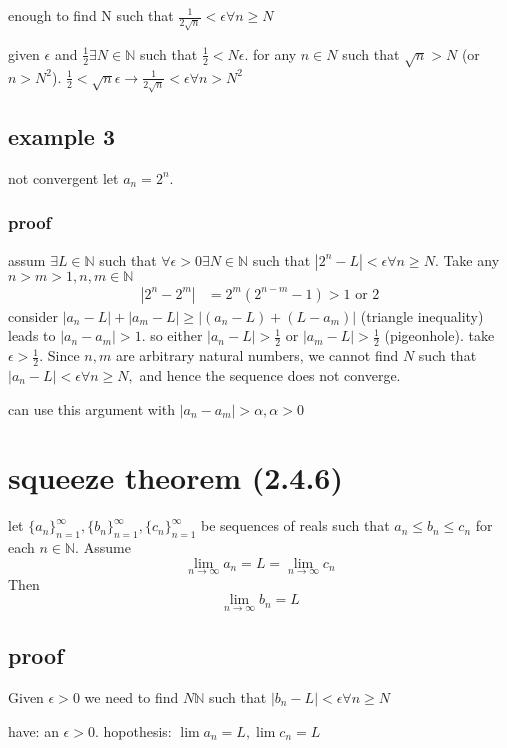 \documentclass[letterpaper]{article}
\begin{document}
enough to find N such that $\frac{1}{2\sqrt{n}}<\epsilon\forall n\ge N$

given $\epsilon$ and $\frac{1}{2}$$\exists N\in\mathbb{N}$ such that $\frac{1}{2}<N\epsilon$. for any $n\in N$ such that $\sqrt{n}>N$ (or $n>N^2$). $\frac{1}{2}<\sqrt{n}\epsilon\rightarrow\frac{1}{2\sqrt{n}}<\epsilon\forall n>N^2$

\subsection*{example 3}
not convergent
let $a_n=2^n$.
\subsubsection*{proof}
assum $\exists L\in \mathbb{N}$ such that $\forall \epsilon>0\exists N\in\mathbb{N}$ such that $\left\lvert 2^n-L\right\rvert<\epsilon\forall n\ge N$. Take any $n>m>1, n,m\in\mathbb{N}$
\begin{align*}
  \left\lvert2^n-2^m\right\rvert&=2^m\left(2^{n-m}-1\right)>1\text{ or }2
\end{align*}
consider $\left\lvert a_n-L\right\rvert+\left\lvert a_m-L\right\rvert\ge\left\lvert(a_n-L)+(L-a_m)\right\rvert$ (triangle inequality) leads to $\left\lvert a_n-a_m\right\rvert>1$. so either $\left\lvert a_n-L\right\rvert>\frac{1}{2}$ or $\left\lvert a_m-L\right\rvert>\frac{1}{2}$ (pigeonhole). take $\epsilon>\frac{1}{2}$. Since $n,m$ are arbitrary natural numbers, we cannot find $N$ such that $\left\lvert a_n-L\right\rvert<\epsilon\forall n\ge N,$ and hence the sequence does not converge.

can use this argument with $\left\lvert a_n-a_m\right\rvert>\alpha, \alpha>0$

\section*{squeeze theorem (2.4.6)}
let $\{a_n\}_{n=1}^\infty,\{b_n\}_{n=1}^\infty,\{c_n\}_{n=1}^\infty$ be sequences of reals such that $a_n\le b_n\le c_n$ for each $n\in\mathbb{N}$. Assume
\[\lim_{n\to\infty}a_n=L=\lim_{n\to\infty}c_n\]
Then 
\[\lim_{n\to\infty}b_n=L\]
\subsection*{proof}
Given $\epsilon>0$ we need to find $N\mathbb{N}$ such that $\left\lvert b_n-L\right\rvert<\epsilon\forall n\ge N$

have: an $\epsilon>0$. hopothesis: $\lim a_n=L, \lim c_n=L$
\end{document}
